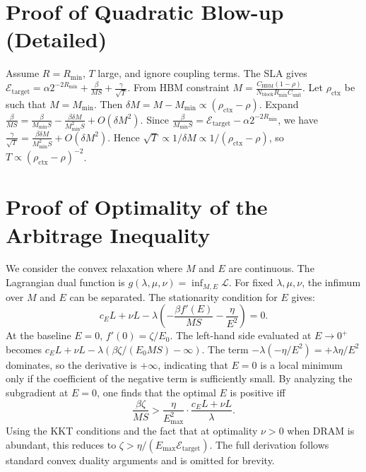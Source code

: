 \documentclass[11pt,a4paper]{article}
\theoremstyle{plain}
\theoremstyle{definition}
\begin{document}
\appendix
\section{Proof of Quadratic Blow-up (Detailed)}
Assume $R=R_{\min}$, $T$ large, and ignore coupling terms. The SLA gives $\mathcal{E}_{\text{target}} = \alpha 2^{-2R_{\min}} + \frac{\beta}{MS} + \frac{\gamma}{\sqrt{T}}$. From HBM constraint $M = \frac{C_{\text{HBM}}(1-\rho)}{N_{\text{block}} R_{\min} C_{\text{unit}}}$. Let $\rho_{\text{ctx}}$ be such that $M=M_{\min}$. Then $\delta M = M-M_{\min} \propto (\rho_{\text{ctx}}-\rho)$. Expand $\frac{\beta}{MS} = \frac{\beta}{M_{\min}S} - \frac{\beta \delta M}{M_{\min}^2 S} + O(\delta M^2)$. Since $\frac{\beta}{M_{\min}S} = \mathcal{E}_{\text{target}} - \alpha 2^{-2R_{\min}}$, we have $\frac{\gamma}{\sqrt{T}} = \frac{\beta \delta M}{M_{\min}^2 S} + O(\delta M^2)$. Hence $\sqrt{T} \propto 1/\delta M \propto 1/(\rho_{\text{ctx}}-\rho)$, so $T \propto (\rho_{\text{ctx}}-\rho)^{-2}$.

\section{Proof of Optimality of the Arbitrage Inequality}
\label{app:optimality}
We consider the convex relaxation where $M$ and $E$ are continuous. The Lagrangian dual function is $g(\lambda,\mu,\nu)=\inf_{M,E}\mathcal{L}$. For fixed $\lambda,\mu,\nu$, the infimum over $M$ and $E$ can be separated. The stationarity condition for $E$ gives:
\[
c_E L + \nu L - \lambda\left(-\frac{\beta f'(E)}{M S} - \frac{\eta}{E^2}\right) = 0.
\]
At the baseline $E=0$, $f'(0)=\zeta/E_0$. The left-hand side evaluated at $E\to0^+$ becomes $c_E L + \nu L - \lambda(\beta\zeta/(E_0 M S) - \infty)$. The term $-\lambda(-\eta/E^2)=+\lambda\eta/E^2$ dominates, so the derivative is $+\infty$, indicating that $E=0$ is a local minimum only if the coefficient of the negative term is sufficiently small. By analyzing the subgradient at $E=0$, one finds that the optimal $E$ is positive iff
\[
\frac{\beta\zeta}{M S} > \frac{\eta}{E_{\max}^2} \cdot \frac{c_E L + \nu L}{\lambda}.
\]
Using the KKT conditions and the fact that at optimality $\nu>0$ when DRAM is abundant, this reduces to $\zeta > \eta/(E_{\max}\mathcal{E}_{\text{target}})$. The full derivation follows standard convex duality arguments and is omitted for brevity.
\end{document}
